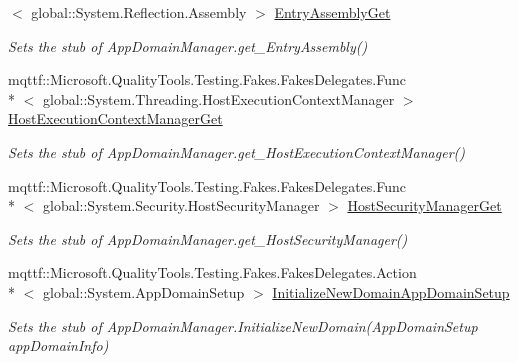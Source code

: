 \begin{DoxyCompactItemize}
$<$ global\-::\-System.\-Reflection.\-Assembly $>$ \hyperlink{class_system_1_1_fakes_1_1_stub_app_domain_manager_a72fedbb4e079b031ebc7c717385e2c2b}{Entry\-Assembly\-Get}
\begin{DoxyCompactList}\small\item\em Sets the stub of App\-Domain\-Manager.\-get\-\_\-\-Entry\-Assembly()\end{DoxyCompactList}\item 
mqttf\-::\-Microsoft.\-Quality\-Tools.\-Testing.\-Fakes.\-Fakes\-Delegates.\-Func\\*
$<$ global\-::\-System.\-Threading.\-Host\-Execution\-Context\-Manager $>$ \hyperlink{class_system_1_1_fakes_1_1_stub_app_domain_manager_a133c3c6500c653d19f1b640c3a8692f8}{Host\-Execution\-Context\-Manager\-Get}
\begin{DoxyCompactList}\small\item\em Sets the stub of App\-Domain\-Manager.\-get\-\_\-\-Host\-Execution\-Context\-Manager()\end{DoxyCompactList}\item 
mqttf\-::\-Microsoft.\-Quality\-Tools.\-Testing.\-Fakes.\-Fakes\-Delegates.\-Func\\*
$<$ global\-::\-System.\-Security.\-Host\-Security\-Manager $>$ \hyperlink{class_system_1_1_fakes_1_1_stub_app_domain_manager_af29db4e09299ba8e07035148e88abd0f}{Host\-Security\-Manager\-Get}
\begin{DoxyCompactList}\small\item\em Sets the stub of App\-Domain\-Manager.\-get\-\_\-\-Host\-Security\-Manager()\end{DoxyCompactList}\item 
mqttf\-::\-Microsoft.\-Quality\-Tools.\-Testing.\-Fakes.\-Fakes\-Delegates.\-Action\\*
$<$ global\-::\-System.\-App\-Domain\-Setup $>$ \hyperlink{class_system_1_1_fakes_1_1_stub_app_domain_manager_a4f61f37bd2ee9ad0a086dc74d8fb813e}{Initialize\-New\-Domain\-App\-Domain\-Setup}
\begin{DoxyCompactList}\small\item\em Sets the stub of App\-Domain\-Manager.\-Initialize\-New\-Domain(\-App\-Domain\-Setup app\-Domain\-Info)\end{DoxyCompactList}\end{DoxyCompactItemize}
